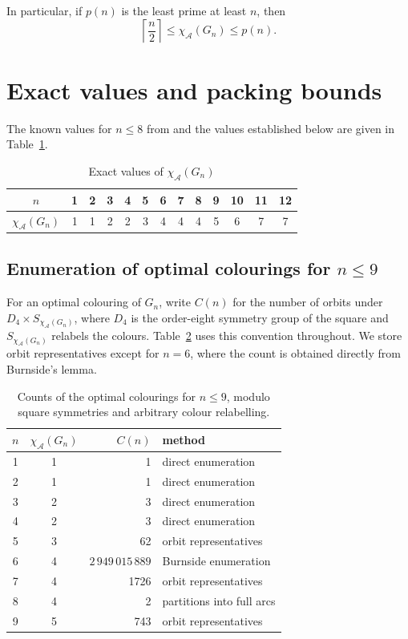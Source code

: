 \documentclass[11pt]{article}
\theoremstyle{definition}
\theoremstyle{remark}
\newcommand{\Dfour}{D_4}
\renewcommand{\le}{\leqslant}
\begin{document}
In particular, if \(p(n)\) is the least prime at least \(n\), then
\[
  \left\lceil\frac n2\right\rceil\le \chi_{\mathcal{A}}(G_n)\le p(n).
\]

\section{Exact values and packing bounds}

The known values for \(n\le8\) from
\cite{AraujoMartinez2026,AraujoMartinezCode2026} and the values established
below are given in Table~\ref{T:exactval}.

\begin{table}[h!]
\begin{center}
\begin{tabular}{@{}c*{12}{c}@{}}
\toprule
\(n\) & 1&2&3&4&5&6&7&8&9&10&11&12\\
\midrule
\(\chi_{\mathcal{A}}(G_n)\) & 1&1&2&2&3&4&4&4&5&6&7&7\\
\bottomrule
\end{tabular}
\caption{\label{T:exactval}Exact values of \(\chi_{\mathcal{A}}(G_n)\)}
\end{center}
\end{table}


\subsection{Enumeration of optimal colourings for
  \texorpdfstring{\(n\le9\)}{n at most 9}}

For an optimal colouring of \(G_n\), write \(C(n)\) for the number of
orbits under \(\Dfour\times S_{\chi_{\mathcal{A}}(G_n)}\), where \(\Dfour\) is the order-eight
symmetry group of the square and \(S_{\chi_{\mathcal{A}}(G_n)}\) relabels the colours.
Table~\ref{tab:small-orbits} uses this
convention throughout.  We store orbit representatives except for \(n=6\),
where the count is obtained directly from Burnside's lemma.

\begin{table}[htbp]
\centering
\begin{tabular}{@{}ccrl@{}}
\toprule
\(n\) & \(\chi_{\mathcal{A}}(G_n)\) & \(C(n)\) & method\\
\midrule
1 & 1 & 1 & direct enumeration\\
2 & 1 & 1 & direct enumeration\\
3 & 2 & 3 & direct enumeration\\
4 & 2 & 3 & direct enumeration\\
5 & 3 & 62 & orbit representatives\\
6 & 4 & \(2\,949\,015\,889\) & Burnside enumeration\\
7 & 4 & 1726 & orbit representatives\\
8 & 4 & 2 & partitions into full arcs\\
9 & 5 & 743 & orbit representatives\\
\bottomrule
\end{tabular}
\caption{Counts of the optimal colourings for \(n\le9\), modulo square symmetries
and arbitrary colour relabelling.}
\label{tab:small-orbits}
\end{table}
\end{document}
